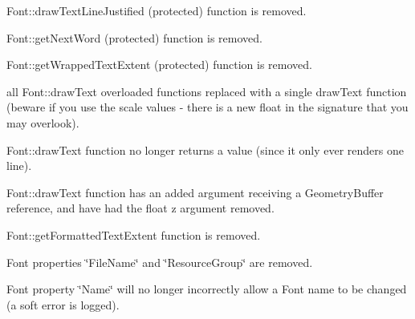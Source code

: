 \begin{DoxyItemize}
\item {\ttfamily Font\+::draw\+Text\+Line\+Justified} (protected) function is removed.
\item {\ttfamily Font\+::get\+Next\+Word} (protected) function is removed.
\item {\ttfamily Font\+::get\+Wrapped\+Text\+Extent} (protected) function is removed.
\item all Font\+::draw\+Text overloaded functions replaced with a single draw\+Text function (beware if you use the scale values -\/ there is a new float in the signature that you may overlook).
\item Font\+::draw\+Text function no longer returns a value (since it only ever renders one line).
\item Font\+::draw\+Text function has an added argument receiving a Geometry\+Buffer reference, and have had the float z argument removed.
\item {\ttfamily Font\+::get\+Formatted\+Text\+Extent} function is removed.
\item Font properties {\ttfamily \char`\"{}\+File\+Name\char`\"{}} and {\ttfamily \char`\"{}\+Resource\+Group\char`\"{}} are removed.
\item Font property {\ttfamily \char`\"{}\+Name\char`\"{}} will no longer incorrectly allow a Font name to be changed (a \textquotesingle{}soft\textquotesingle{} error is logged).
\end{DoxyItemize}

